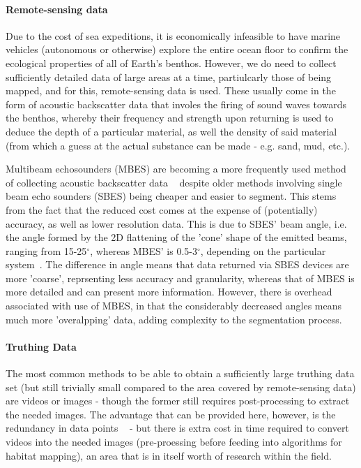             \paragraph{Remote-sensing data}
            Due to the cost of sea expeditions, it is economically infeasible to have marine vehicles (autonomous or otherwise) explore the entire ocean floor to confirm the ecological properties of all of Earth's benthos. However, we do need to collect sufficiently detailed data of large areas at a time, partiulcarly those of being mapped, and for this, remote-sensing data is used. These usually come in the form of acoustic backscatter data that involes the firing of sound waves towards the benthos, whereby their frequency and strength upon returning is used to deduce the depth of a particular material, as well the density of said material (from which a guess at the actual substance can be made - e.g. sand, mud, etc.).

            Multibeam echosounders (MBES) are becoming a more frequently used method of collecting acoustic backscatter data ~\citep*{calvert15} despite older methods involving single beam echo sounders (SBES) being cheaper and easier to segment. This stems from the fact that the reduced cost comes at the expense of (potentially) accuracy, as well as lower resolution data. This is due to SBES' beam angle, i.e. the angle formed by the 2D flattening of the 'cone' shape of the emitted beams, ranging from 15-25$^{\circ}$, whereas MBES' is 0.5-3$^{\circ}$, depending on the particular system~\citep*{cjbrown11}. The difference in angle means that data returned via SBES devices are more 'coarse', reprsenting less accuracy and granularity, whereas that of MBES is more detailed and can present more information. However, there is overhead associated with use of MBES, in that the considerably decreased angles means much more 'overalpping' data, adding complexity to the segmentation process.

            \paragraph{Truthing Data}
             The most common methods to be able to obtain a sufficiently large truthing data set (but still trivially small compared to the area covered by remote-sensing data) are videos or images - though the former still requires post-processing to extract the needed images. The advantage that can be provided here, however, is the redundancy in data points ~\citep*{rattray14}  - but there is extra cost in time required to convert videos into the needed images (pre-proessing before feeding into algorithms for habitat mapping), an area that is in itself worth of research within the field.~\citep*{lucieer13}

